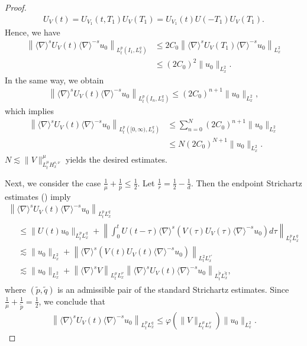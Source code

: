 \documentclass[AHL,Unicode,longabstracts,MathTools,published]{cedram}
\newcommand{\ph}{\varphi}
\newcommand{\ta}{\tau}
\newcommand{\wt}{\widetilde}
\renewcommand{\No}[1]{\left\| #1 \right\|}
\newcommand{\I}{\infty}
\newcommand{\sd}{\langle \nabla \rangle}
\newcommand{\tw}{\frac{1}{2}}
\newcommand{\ls}{\lesssim}
\begin{document}
\begin{proof}
\begin{align}
U_V(t) = U_{V_1}(t,T_1)U_V(T_1) = U_{V_1}(t) U(-T_1) U_V(T_1).
\end{align}
Hence, we have
\begin{equation}
\begin{split}
\left\|\sd^s U_V(t) \sd^{-s} u_0\right\|_{L^p_t\left(I_1,L^q_x\right)} &\le 2C_0\left\|\sd^s U_V(T_1)\sd^{-s} u_0\right\|_{L^2_x} \\
&\le (2C_0)^2 \|u_0\|_{L^2_x}.
\end{split}
\end{equation}
In the same way, we obtain
\begin{align}
\left\|\sd^s U_V(t) \sd^{-s} u_0\right\|_{L^p_t\left(I_n,L^q_x\right)}
\le (2C_0)^{n+1} \|u_0\|_{L^2_x},
\end{align}
which implies
\begin{equation}
\begin{split}
\left\|\sd^s U_V(t) \sd^{-s} u_0\right\|_{L^p_t\left([0,\I),L^q_x\right)} &\le \sum_{n=0}^N (2C_0)^{n+1} \|u_0\|_{L^2_x}
\\
&\le N(2C_0)^{N+1} \|u_0\|_{L^2_x}.
\end{split}
\end{equation}
$N \ls \|V\|_{L^\mu_t H^{s,\nu}_x}^\mu$ yields the desired estimates.

Next, we consider the case $\frac{1}{\mu} + \frac{1}{p} \le \tw$. Let $\frac{1}{r}=\frac{1}{2}-\frac{1}{d}$. Then the endpoint Strichartz estimates (\cite{1998KT}) imply
\begin{multline}
\left\|\sd^s U_V(t)\sd^{-s} u_0\right\|_{L^p_t L^q_x}\\
\begin{aligned}
&\le \|U(t)u_0\|_{L^p_t L^q_x} + \No{ \int_0^t U(t-\ta)\sd^s \left(V(\ta)U_V(\ta) \sd^{-s}u_0\right)d\ta }_{L^p_t L^q_x} \\
&\ls \|u_0\|_{L^2_x} + \left\|\sd^s \left(V(t)U_V(t)\sd^{-s}u_0\right)\right\|_{L^2_t L^{r'}_x} \\
&\ls \|u_0\|_{L^2_x} + \left\|\sd^s V\right\|_{L^\mu_t L^\nu_x} \left\|\sd^s U_V(t)\sd^{-s} u_0 \right\|_{L^{\wt{p}}_t L^{\wt{q}}_x},
\end{aligned}
\end{multline}
where $(\wt{p}, \wt{q})$ is an admissible pair of the standard Strichartz estimates. Since $\frac{1}{\mu}+\frac{1}{\wt{p}} = \tw$, we conclude that
\begin{align}
\left\|\sd^s U_V(t)\sd^{-s} u_0\right\|_{L^p_t L^q_x}
\le \ph\left(\|V\|_{L^\mu_t L^\nu_x}\right) \|u_0\|_{L^2_x}.
\end{align}


\end{proof}
\end{document}
